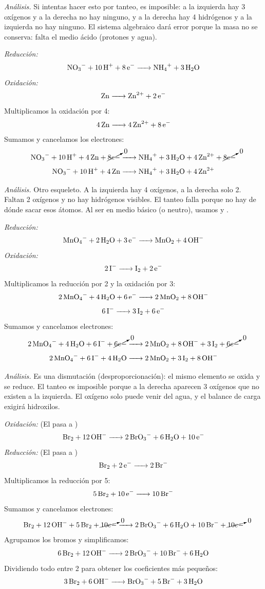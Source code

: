 \begin{exercise}{}{}

\textit{Análisis.} Si intentas hacer esto por tanteo, es imposible:
a la izquierda hay 3 oxígenos y a la derecha no hay ninguno, y a la
derecha hay 4 hidrógenos y a la izquierda no hay ninguno. El
sistema algebraico dará error porque la masa no se conserva: falta
el medio ácido (protones y agua).

\textit{Reducción:}
\[
\ce{NO3- + 10H+ + 8e- -> NH4+ + 3H2O}
\]
\textit{Oxidación:}
\[
\ce{Zn -> Zn^{2+} + 2e-}
\]
Multiplicamos la oxidación por 4:
\[
\ce{4Zn -> 4Zn^{2+} + 8e-}
\]
Sumamos y cancelamos los electrones:
\[
\ce{
NO3- + 10H+ + 4Zn + \cancelto{0}{8e-}
-> NH4+ + 3H2O + 4Zn^{2+} + \cancelto{0}{8e-}
}
\]
\[
\ce{NO3- + 10H+ + 4Zn -> NH4+ + 3H2O + 4Zn^{2+}}
\]
\end{exercise}

\begin{exercise}{}{}

\textit{Análisis.} Otro esqueleto. A la izquierda hay 4 oxígenos,
a la derecha solo 2. Faltan 2 oxígenos y no hay hidrógenos
visibles. El tanteo falla porque no hay de dónde sacar esos átomos.
Al ser en medio básico (o neutro), usamos  y .

\textit{Reducción:}
\[
\ce{MnO4- + 2H2O + 3e- -> MnO2 + 4OH-}
\]
\textit{Oxidación:}
\[
\ce{2I- -> I2 + 2e-}
\]
Multiplicamos la reducción por 2 y la oxidación por 3:
\[
\ce{2MnO4- + 4H2O + 6e- -> 2MnO2 + 8OH-}
\]
\[
\ce{6I- -> 3I2 + 6e-}
\]
Sumamos y cancelamos electrones:
\[
\ce{
2MnO4- + 4H2O + 6I- + \cancelto{0}{6e-}
-> 2MnO2 + 8OH- + 3I2 + \cancelto{0}{6e-}
}
\]
\[
\ce{2MnO4- + 6I- + 4H2O -> 2MnO2 + 3I2 + 8OH-}
\]
\end{exercise}

\begin{exercise}{}{}

\textit{Análisis.} Es una dismutación (desproporcionación): el
mismo elemento se oxida y se reduce. El tanteo es imposible porque
a la derecha aparecen 3 oxígenos que no existen a la izquierda.
El oxígeno solo puede venir del agua, y el balance de carga exigirá
hidroxilos.

\textit{Oxidación:} (El  pasa a )
\[
\ce{Br2 + 12OH- -> 2BrO3- + 6H2O + 10e-}
\]
\textit{Reducción:} (El  pasa a )
\[
\ce{Br2 + 2e- -> 2Br-}
\]
Multiplicamos la reducción por 5:
\[
\ce{5Br2 + 10e- -> 10Br-}
\]
Sumamos y cancelamos electrones:
\[
\ce{
Br2 + 12OH- + 5Br2 + \cancelto{0}{10e-}
-> 2BrO3- + 6H2O + 10Br- + \cancelto{0}{10e-}
}
\]
Agrupamos los bromos y simplificamos:
\[
\ce{6Br2 + 12OH- -> 2BrO3- + 10Br- + 6H2O}
\]
Dividiendo todo entre 2 para obtener los coeficientes más pequeños:
\[
\ce{3Br2 + 6OH- -> BrO3- + 5Br- + 3H2O}
\]
\end{exercise}

